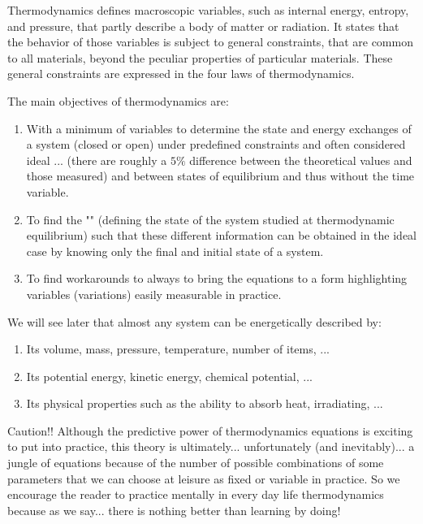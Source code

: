 	 Thermodynamics defines macroscopic variables, such as internal energy, entropy, and pressure, that partly describe a body of matter or radiation. It states that the behavior of those variables is subject to general constraints, that are common to all materials, beyond the peculiar properties of particular materials. These general constraints are expressed in the four laws of thermodynamics. 
	
	The main objectives of thermodynamics are:
	\begin{enumerate}
		\item With a minimum of variables to determine the state and energy exchanges of a system (closed or open) under predefined constraints and often considered ideal ... (there are roughly a $5\%$ difference between the theoretical values and those measured) and between states of equilibrium and thus without the time variable.
		
		\item To find the "" (defining the state of the system studied at thermodynamic equilibrium) such that these different information can be obtained in the ideal case by knowing only the final and initial state of a system.
		
		\item To find workarounds to always to bring the equations to a form highlighting variables (variations) easily measurable in practice.
	\end{enumerate}
	We will see later that almost any system can be energetically described by:
	\begin{enumerate}
		\item Its volume, mass, pressure, temperature, number of items, ...
		
		\item Its potential energy, kinetic energy, chemical potential, ...
		
		\item Its physical properties such as the ability to absorb heat, irradiating, ...
	\end{enumerate}
	Caution!! Although the predictive power of thermodynamics equations is exciting to put into practice, this theory is ultimately... unfortunately (and inevitably)... a jungle of equations because of the number of possible combinations of some parameters that we can choose at leisure as fixed or variable in practice. So we encourage the reader to practice mentally in every day life thermodynamics because as we say... there is nothing better than learning by doing!
	

